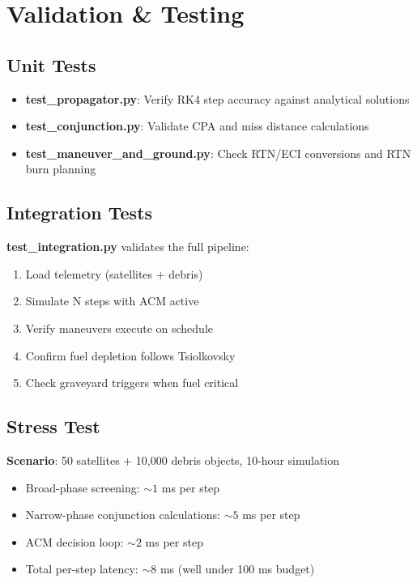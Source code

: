 \documentclass[11pt,a4paper]{article}
\begin{document}
\section{Validation \& Testing}

\subsection{Unit Tests}

\begin{itemize}
    \item \textbf{test\_propagator.py}: Verify RK4 step accuracy against analytical solutions
    \item \textbf{test\_conjunction.py}: Validate CPA and miss distance calculations
    \item \textbf{test\_maneuver\_and\_ground.py}: Check RTN/ECI conversions and RTN burn planning
\end{itemize}

\subsection{Integration Tests}

\textbf{test\_integration.py} validates the full pipeline:
\begin{enumerate}
    \item Load telemetry (satellites + debris)
    \item Simulate N steps with ACM active
    \item Verify maneuvers execute on schedule
    \item Confirm fuel depletion follows Tsiolkovsky
    \item Check graveyard triggers when fuel critical
\end{enumerate}

\subsection{Stress Test}

\textbf{Scenario}: 50 satellites + 10,000 debris objects, 10-hour simulation
\begin{itemize}
    \item Broad-phase screening: $\sim 1$ ms per step
    \item Narrow-phase conjunction calculations: $\sim 5$ ms per step
    \item ACM decision loop: $\sim 2$ ms per step
    \item Total per-step latency: $\sim 8$ ms (well under 100 ms budget)
\end{itemize}
\end{document}

